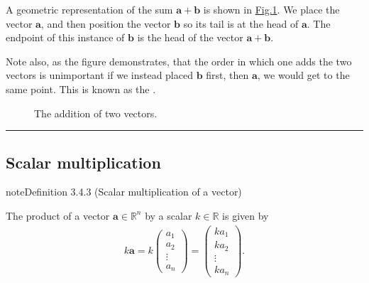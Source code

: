 \documentclass[letterpaper,10pt,english]{jupyterBook}
\let\sphinxpxdimen\pdfpxdimen\else\newdimen\sphinxpxdimen
\begin{document}
\sphinxAtStartPar
A geometric representation of the sum \(\mathbf{a}+\mathbf{b}\) is shown in \hyperref[\detokenize{_pages/3.1_Vector_arithmetic:vector-addition-figure}]{Fig.\@ \ref{\detokenize{_pages/3.1_Vector_arithmetic:vector-addition-figure}}}. We place the vector \(\mathbf{a}\), and then position the vector \(\mathbf{b}\) so its tail is at the head of \(\mathbf{a}\). The endpoint of this instance of \(\mathbf{b}\) is the head of the vector \(\mathbf{a+b}\).

\sphinxAtStartPar
Note also, as the figure demonstrates, that the order in which one adds the two vectors is unimportant \sphinxhyphen{} if we instead placed \(\mathbf{b}\) first, then \(\mathbf{a}\), we would get to the same point. This is known as the .

\begin{figure}[htbp]
\centering
\capstart

\noindent\sphinxincludegraphics[width=500\sphinxpxdimen]{{3_vector_addition}.svg}
\caption{The addition of two vectors.}\label{\detokenize{_pages/3.1_Vector_arithmetic:vector-addition-figure}}\end{figure}


\bigskip\hrule\bigskip


\ignorespaces 



\subsection{Scalar multiplication}
\label{\detokenize{_pages/3.1_Vector_arithmetic:scalar-multiplication}}\label{_pages/3.1_Vector_arithmetic:scalar-multiplication-of-a-vector-definition}
\begin{sphinxadmonition}{note}{Definition 3.4.3 (Scalar multiplication of a vector)}



\sphinxAtStartPar
The product of a vector \(\mathbf{a}\in \mathbb{R}^n\) by a scalar \(k \in \mathbb{R}\) is given by
\begin{equation*}
\begin{split} k \mathbf{a} = k\begin{pmatrix} a_1 \\ a_2 \\ \vdots \\ a_n \end{pmatrix} =
\begin{pmatrix} k a_1 \\ k a_2 \\ \vdots \\ k a_n \end{pmatrix}. \end{split}
\end{equation*}\end{sphinxadmonition}
\end{document}
